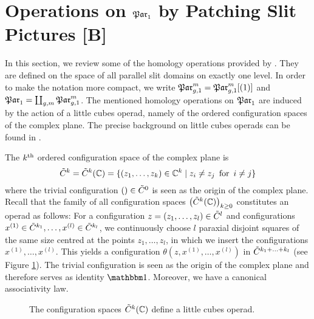 \section{Operations on \texorpdfstring{$\mathfrak{Par}_1$}{Par1} by Patching Slit Pictures [B]}
\label{homology_operations:parallel_patching_slit_pics}
In this section, we review some of the homology operations provided by \cite{Boedigheimer19902}.
They are defined on the space of all parallel slit domains on exactly one level.
\label{page:shorthand_par_1}%
In order to make the notation more compact, we write $\mathfrak{Par}^m_{g,1} = \mathfrak{Par}^m_{g,1}[(1)]$ and $\mathfrak{Par}_1 = \coprod_{g,m} \mathfrak{Par}^m_{g,1}$.
The mentioned homology operations on $\mathfrak{Par}_1$ are induced by the action of a little cubes operad, namely of the ordered configuration spaces of the complex plane.
The precise background on little cubes operads can be found in \cite{May1972}.

\label{page:configuration_space_cplx_plane}%
The $k^{\text{th}}$ ordered configuration space of the complex plane is
\[
    \cspc k = \cspc k (\C) = \{ ( z_1, \ldots, z_k) \in \C^k \mid z_i \neq z_j \mspc{for}{5} i\neq j\}
\]
where the trivial configuration $() \in {\tilde C^{0}}$ is seen as the origin of the complex plane.
\label{page:operad_theta}%
Recall that the family of all configuration spaces $\big( {\tilde C^{k}}(\mathbb C) \big)_{k \ge 0}$ constitutes an operad as follows:
For a configuration $z = (z_1, \ldots, z_l) \in \cspc l$ and configurations $x^{(1)} \in \cspc{k_1}, \ldots, x^{(l)} \in \cspc{k_l}$,
we continuously choose $l$ paraxial disjoint squares of the same size centred at the points $z_1, \ldots, z_l$,
in which we insert the configurations $x^{(1)}, \ldots, x^{(l)}$.
This yields a configuration $\theta(z, x^{(1)}, \ldots, x^{(l)})$ in $\cspc{k_1 + \ldots + k_l}$ (see Figure \ref{homology_operations:parallel_patching_slit_pics:the_configuration_space_is_an_operad}).
\label{page:operad_unit}%
The trivial configuration is seen as the origin of the complex plane and therefore serves as identity $\Eins$.
Moreover, we have a canonical associativity law.
\begin{figure}[ht]
    \centering
    \def\svgwidth{.8\columnwidth}
    
    \caption{\label{homology_operations:parallel_patching_slit_pics:the_configuration_space_is_an_operad}The configuration spaces ${\tilde C^{k}}(\mathbb C)$ define a little cubes operad.}
\end{figure}

